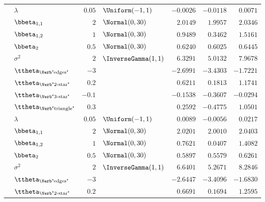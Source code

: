 \begin{table}[t]
\begin{tabular}{cl|rlrrr}
        & $\lambda$                          & $0.05$ & $\Uniform(-1,1)$         & $-0.0026$ & $-0.0118$ & $0.0071$  \\
        & $\bbeta_{1,1}$                     & $2$    & $\Normal(0,30)$          & $2.0149$  & $1.9957$  & $2.0346$  \\
        & $\bbeta_{1,2}$                     & $1$    & $\Normal(0,30)$          & $0.9489$  & $0.3462$  & $1.5161$  \\
        & $\bbeta_{2}$                       & $0.5$  & $\Normal(0,30)$          & $0.6240$  & $0.6025$  & $0.6445$  \\
        & $\sigma^2$                         & $2$    & $\InverseGamma(1,1)$     & $6.3291$  & $5.0132$  & $7.9678$  \\
        & $\ttheta_{\text{\Verb"edges"}}$    & $-3$   &    & $-2.6991$ & $-3.4303$ & $-1.7221$ \\
        & $\ttheta_{\text{\Verb"2-star"}}$   & $0.2$  &   & $0.6211$  & $0.1813$  & $1.1741$  \\
        & $\ttheta_{\text{\Verb"3-star"}}$   & $-0.1$ &  & $-0.1538$ & $-0.3607$ & $-0.0294$ \\
        & $\ttheta_{\text{\Verb"triangle"}}$ & $0.3$  &   & $0.2592$  & $-0.4775$ & $1.0501$  \\
		\midrule
        & $\lambda$                          & $0.05$ & $\Uniform(-1,1)$         & $0.0089$  & $-0.0056$ & $0.0217$  \\
        & $\bbeta_{1,1}$                     & $2$    & $\Normal(0,30)$          & $2.0201$  & $2.0010$  & $2.0403$  \\
        & $\bbeta_{1,2}$                     & $1$    & $\Normal(0,30)$          & $0.7621$  & $0.0407$  & $1.4082$  \\
        & $\bbeta_{2}$                       & $0.5$  & $\Normal(0,30)$          & $0.5897$  & $0.5579$  & $0.6261$  \\
        & $\sigma^2$                         & $2$    & $\InverseGamma(1,1)$     & $6.6401$  & $5.2671$  & $8.2846$  \\
        & $\ttheta_{\text{\Verb"edges"}}$    & $-3$   &    & $-2.6447$ & $-3.4096$ & $-1.6830$ \\
        & $\ttheta_{\text{\Verb"2-star"}}$   & $0.2$  &   & $0.6691$  & $0.1694$  & $1.2595$  \\

\end{tabular}
\end{table}
